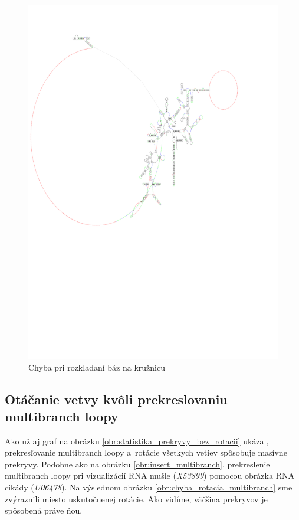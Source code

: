 \begin{figure}
  \includegraphics[clip, trim=0 10cm 3cm 2cm,width=1\textwidth]{../img/chyby/african_frog-echinococcus_granulosus}
  \caption{Chyba pri rozkladaní báz na kružnicu}
  \label{obr:chyba_rozloženie_loopy}
\end{figure}

\subsection{Otáčanie vetvy kvôli prekreslovaniu multibranch loopy}

Ako už aj graf na obrázku \ref{obr:statistika_prekryvy_bez_rotacii} ukázal,
prekresľovanie multibranch loopy a~rotácie všetkych vetiev spôsobuje masívne prekryvy.
Podobne ako na obrázku \ref{obr:insert_multibranch}, prekreslenie multibranch loopy
pri vizualizácií RNA mušle (\textit{X53899}) pomocou obrázka RNA cikády (\textit{U06478}).
Na výslednom obrázku \ref{obr:chyba_rotacia_multibranch} sme zvýraznili miesto
uskutočnenej rotácie. Ako vidíme, väčšina prekryvov je spôsobená práve ňou.

